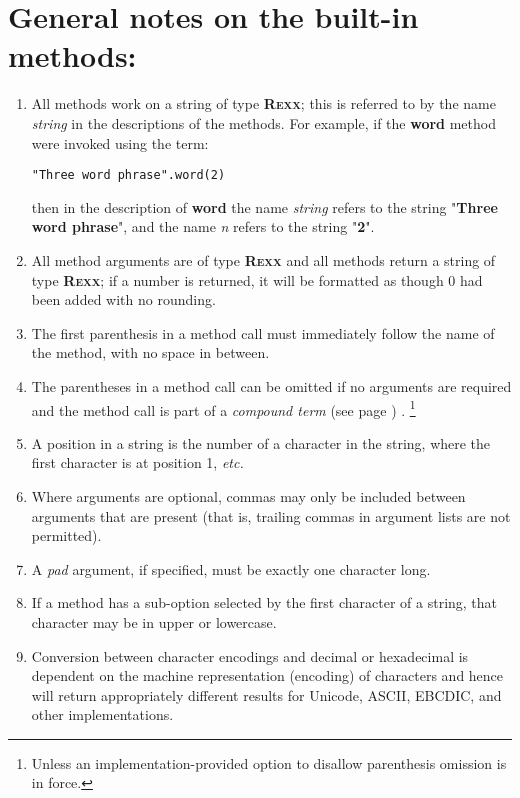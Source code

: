 \section{General notes on the built-in methods:}
\begin{enumerate}
\item All methods work on a \nr{} string of type \textbf{R\textsc{exx}}; this
is referred to by the name \emph{string} in the descriptions of the
methods.  For example, if the \textbf{word} method were invoked using
the term:
\begin{lstlisting}
"Three word phrase".word(2)
\end{lstlisting}
then in the description of \textbf{word} the name
\emph{string} refers to the string "\textbf{Three word
phrase}", and the name \emph{n} refers to the string
"\textbf{2}".
\item All method arguments are of type \textbf{R\textsc{exx}} and all methods
return a string of type \textbf{R\textsc{exx}}; if a number is returned, it
will be formatted as though 0 had been added with no rounding.
\item 
The first parenthesis in a method call must immediately follow the name
of the method, with no space in between.
\item The parentheses in a method call can be omitted if no
arguments are required and the method call is part of a
 \emph{compound term} (see page \pageref{refcomterm}) .
\footnote{
Unless an implementation-provided option to disallow parenthesis
omission is in force.
}
\item A position in a string is the number of a character in the string,
where the first character is at position 1, \emph{etc.}
\item Where arguments are optional, commas may only be included between
arguments that are present (that is, trailing commas in argument lists
are not permitted).
\item A \emph{pad} argument, if specified, must be exactly one
character long.
\item If a method has a sub-option selected by the first character of a
string, that character may be in upper or lowercase.
\item Conversion between character encodings and decimal or hexadecimal
is dependent on the machine representation (encoding) of characters
and hence will return appropriately different results for Unicode,
ASCII, EBCDIC, and other implementations.
\end{enumerate}
